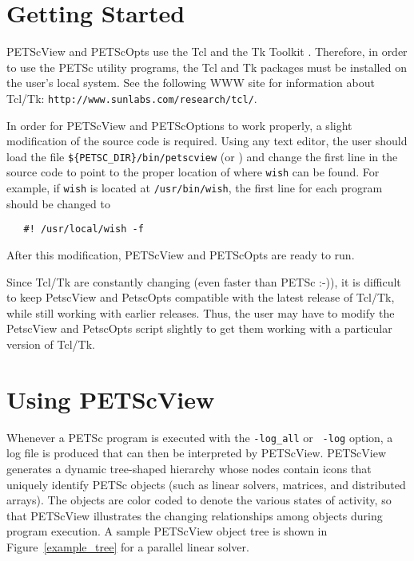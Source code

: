 \section{Getting Started}

PETScView and PETScOpts use the Tcl and the Tk Toolkit
\cite{tcl-tk-web-page}.  Therefore, in order to use the PETSc utility
programs, the Tcl and Tk packages must be installed on the user's
local system.  See the following WWW site for information about
Tcl/Tk: {\tt http://www.sunlabs.com/research/tcl/}.

In order for PETScView and PETScOptions to work properly, a
slight modification of the source code is required.  Using any text
editor, the user should load the file {\tt \$\{PETSC\_DIR\}/bin/petscview} (or 
) and change the
first line in the source code to point to the proper location of where
{\tt wish} can be found.  For example, if {\tt wish} is located at
{\tt /usr/bin/wish}, the first line for each program should be changed
to
\begin{verbatim}
   #! /usr/local/wish -f
\end{verbatim}
After this modification, PETScView and PETScOpts are ready to run.

\medskip \medskip
Since Tcl/Tk are constantly changing (even faster than PETSc :-)),
it is difficult to keep PetscView and PetscOpts compatible with the
latest release of Tcl/Tk, while still working with earlier releases.
Thus, the user may have to modify the PetscView and PetscOpts script slightly
to get them working with a particular version of Tcl/Tk.
 
\section{Using PETScView}
\label{sec:petscview}

 
 
Whenever a PETSc program is executed with the {\tt -log\_all} or {\tt
-log} option, a log file is produced that can then be interpreted by
PETScView.  PETScView generates a dynamic tree-shaped hierarchy whose
nodes contain icons that uniquely identify PETSc objects (such as
linear solvers, matrices, and distributed arrays).  The objects are
color coded to denote the various states of activity, so that
PETScView illustrates the changing relationships among objects during
program execution.  A sample PETScView object tree is shown in 
Figure~\ref{example_tree} for a parallel linear solver.

